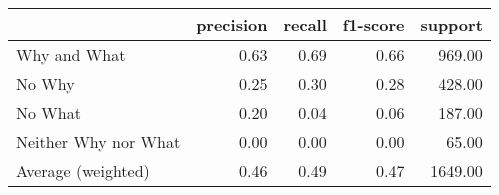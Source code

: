 \begin{tabular}{lrrrr}
\toprule
 & precision & recall & f1-score & support \\
\midrule
Why and What & 0.63 & 0.69 & 0.66 & 969.00 \\
No Why & 0.25 & 0.30 & 0.28 & 428.00 \\
No What & 0.20 & 0.04 & 0.06 & 187.00 \\
Neither Why nor What & 0.00 & 0.00 & 0.00 & 65.00 \\
Average (weighted) & 0.46 & 0.49 & 0.47 & 1649.00 \\
\bottomrule
\end{tabular}
